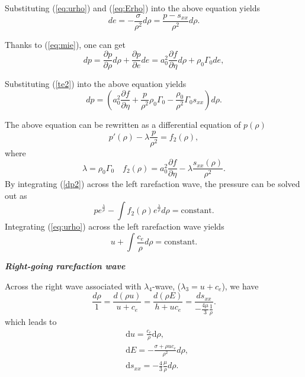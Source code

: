 \documentclass{article}
\numberwithin{equation}{section}
\numberwithin{table}{section}
\begin{document}
Substituting (\ref{eq:urho}) and (\ref{eq:Erho}) into the above equation yields
\begin{equation}\label{te2}
  d e = -\frac{\sigma}{\rho^2} d\rho=\frac{p-s_{xx}}{\rho^2} d\rho.
\end{equation}

Thanks to (\ref{eq:mie}), one can get
\begin{equation}\label{dp1}
  dp =  \frac{\partial p}{\partial \rho}d \rho +  \frac{\partial p}{\partial e}d e= a_0^2 \frac{\partial f}{\partial \eta} d \rho + \rho_0 \Gamma_0 de,
\end{equation}

Substituting (\ref{te2}) into the above equation yields
\begin{equation}
  dp =  \left( a_0^2 \frac{\partial f}{\partial \eta} + \frac{p}{\rho^2}\rho_0\Gamma_0 -\frac{\rho_0}{\rho^2}\Gamma_0 s_{xx}\right) d\rho.
\end{equation}

The above equation  can  be rewritten as a differential equation of $p(\rho)$
\begin{equation} \label{dp2}
  p'(\rho) - \lambda \frac{p}{\rho^2} = f_2(\rho),
\end{equation}
where
\begin{equation}
  \lambda = \rho_0 \Gamma_0 \quad f_2(\rho) = a_0^2\frac{\partial f}{\partial \eta}- \lambda\frac{s_{xx}(\rho)}{\rho^2}.
\end{equation}
By integrating (\ref{dp2}) across the left rarefaction wave, the pressure can be solved out as
\begin{equation}\label{eq:prhoEL}
  p e^{\frac{\lambda}{\rho}} - \int f_2(\rho) e^{\frac{\lambda}{\rho}}d\rho = \text{constant}.
\end{equation}
Integrating  (\ref{eq:urho}) across the left rarefaction wave yields
\begin{equation}\label{eq:urhoEL}
  u+\int\frac{c_e}{\rho} d\rho = \text{constant}.
\end{equation}

\emph{\textbf{Right-going rarefaction wave} }

Across the right wave associated with $\lambda_4$-wave, ($\lambda_3=u+c_e$), we have
\begin{equation}
  \frac{d\rho}{1} = \frac{d(\rho u)}{u+c_e} = \frac{d(\rho E)}{h+uc_e} = \frac{ds_{xx}}{-\frac{4\mu}{3}\frac{1}{\rho}}.
\end{equation}
which leads to
\begin{align}
  \label{eq:urhoR}
  & \text{d} u =\frac{c_e}{\rho}\text{d}\rho,\\
 \label{eq:ErhoR}
  & \text{d} E = -\frac{\sigma+\rho u c_e}{\rho^2} d\rho,\\
\label{eq:sxxrhoR}
& \text{d} s_{xx} = -\frac{4}{3}\frac{\mu}{\rho} d\rho.
\end{align}
\end{document}
